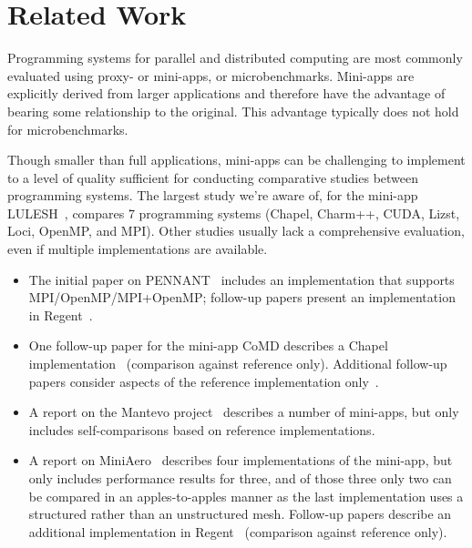 \section{Related Work}
\label{sec:related-work}

Programming systems for parallel and distributed computing are most
commonly evaluated using proxy- or mini-apps, or
micro\-benchmarks. Mini-apps are explicitly derived from larger
applications and therefore have the advantage of bearing some
relationship to the original. This advantage typically does not hold
for microbenchmarks.

Though smaller than full applications, mini-apps can be challenging to
implement to a level of quality sufficient for conducting comparative
studies between programming systems. The largest study we're aware of,
for the mini-app LULESH~\cite{LULESH13}, compares 7 programming
systems (Chapel, Charm++, CUDA, Lizst, Loci, OpenMP, and MPI). Other
studies usually lack a comprehensive evaluation, even if multiple
implementations are available.

\begin{itemize}

\item
The initial paper on PENNANT~\cite{PENNANT} includes an
implementation that supports MPI/OpenMP/MPI+OpenMP; follow-up papers present an implementation in
Regent~\cite{Regent15, ControlReplication17, LegionTracing18}.

\item
One follow-up paper for the mini-app CoMD describes a Chapel
implementation~\cite{CoMDChapel16} (comparison against reference
only). Additional follow-up papers consider aspects of the reference
implementation only~\cite{CoMDLoadImbalance17,
  CoMDThreadedModels14}.

\item
A report on the Mantevo project~\cite{Mantevo09} describes a number of
mini-apps, but only includes self-comparisons based on reference
implementations.

\item
A report on MiniAero~\cite{SandiaReportManyTaskRuntimes15} describes
four implementations of the mini-app, but only includes performance
results for three, and of those three only two can be compared in an
apples-to-apples manner as the last implementation uses a structured
rather than an unstructured mesh. Follow-up papers describe an
additional implementation in Regent~\cite{Regent15,
  ControlReplication17, LegionTracing18} (comparison against reference
only).

\end{itemize}

